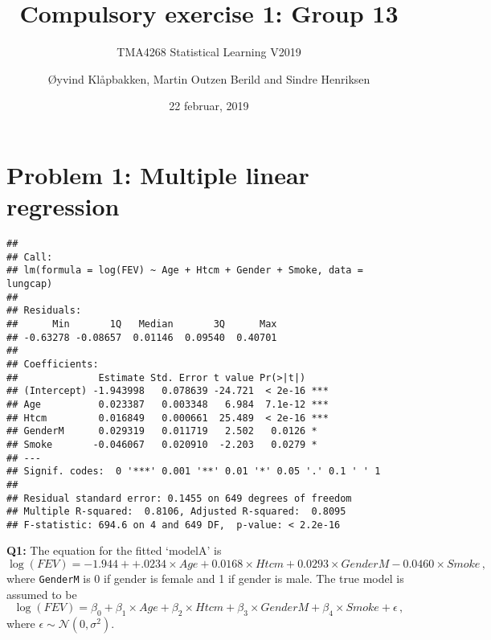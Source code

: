 \documentclass[]{article}
\title{Compulsory exercise 1: Group 13}
\subtitle{TMA4268 Statistical Learning V2019}
\author{Øyvind Klåpbakken, Martin Outzen Berild and Sindre Henriksen}
\date{22 februar, 2019}
\newenvironment{Shaded}{\begin{snugshade}}{\end{snugshade}}
\newcommand{\KeywordTok}[1]{\textcolor[rgb]{0.13,0.29,0.53}{\textbf{#1}}}
\newcommand{\DataTypeTok}[1]{\textcolor[rgb]{0.13,0.29,0.53}{#1}}
\newcommand{\FloatTok}[1]{\textcolor[rgb]{0.00,0.00,0.81}{#1}}
\newcommand{\StringTok}[1]{\textcolor[rgb]{0.31,0.60,0.02}{#1}}
\newcommand{\OperatorTok}[1]{\textcolor[rgb]{0.81,0.36,0.00}{\textbf{#1}}}
\newcommand{\NormalTok}[1]{#1}
\begin{document}
\maketitle

\section{Problem 1: Multiple linear
regression}\label{problem-1-multiple-linear-regression}

\begin{Shaded}
\end{Shaded}

\begin{verbatim}
## 
## Call:
## lm(formula = log(FEV) ~ Age + Htcm + Gender + Smoke, data = lungcap)
## 
## Residuals:
##      Min       1Q   Median       3Q      Max 
## -0.63278 -0.08657  0.01146  0.09540  0.40701 
## 
## Coefficients:
##              Estimate Std. Error t value Pr(>|t|)    
## (Intercept) -1.943998   0.078639 -24.721  < 2e-16 ***
## Age          0.023387   0.003348   6.984  7.1e-12 ***
## Htcm         0.016849   0.000661  25.489  < 2e-16 ***
## GenderM      0.029319   0.011719   2.502   0.0126 *  
## Smoke       -0.046067   0.020910  -2.203   0.0279 *  
## ---
## Signif. codes:  0 '***' 0.001 '**' 0.01 '*' 0.05 '.' 0.1 ' ' 1
## 
## Residual standard error: 0.1455 on 649 degrees of freedom
## Multiple R-squared:  0.8106, Adjusted R-squared:  0.8095 
## F-statistic: 694.6 on 4 and 649 DF,  p-value: < 2.2e-16
\end{verbatim}

\textbf{Q1:} The equation for the fitted `modelA' is
\[\log(FEV) = -1.944 + +.0234 \times Age + 0.0168 \times Htcm + 0.0293 \times 
GenderM - 0.0460 \times Smoke \, ,\] where \texttt{GenderM} is 0 if
gender is female and 1 if gender is male. The true model is assumed to
be
\[\log(FEV) = \beta_0 + \beta_1 \times Age + \beta_2 \times Htcm + \beta_3
\times GenderM + \beta_4 \times Smoke + \epsilon \, ,\] where
\(\epsilon \sim \mathcal{N}(0, \sigma^2)\).
\end{document}
